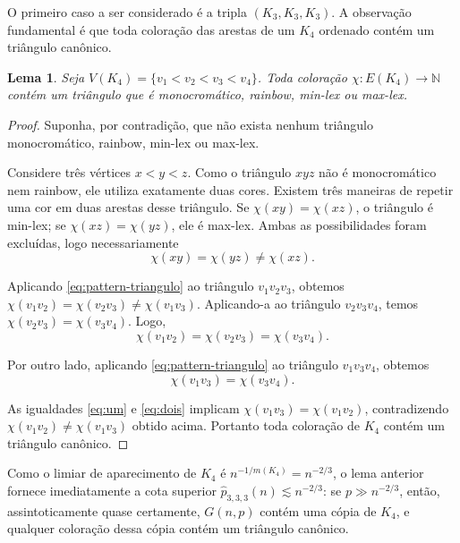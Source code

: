 \documentclass[reqno, 12pt]{amsart}
\numberwithin{equation}{section}
\theoremstyle{plain}
\newtheorem{lemma}[theorem]{Lema}
\theoremstyle{definition}
\begin{document}
O primeiro caso a ser considerado é a tripla $(K_3,K_3,K_3)$. A
observação fundamental é que toda coloração das arestas de um $K_4$
ordenado contém um triângulo canônico.

\begin{lemma}
  \label{lem:K4-canonical-triangle}
  Seja $V(K_4)=\{v_1<v_2<v_3<v_4\}$. Toda coloração
  $\chi:E(K_4)\to\mathbb{N}$ contém um triângulo que é
  monocromático, rainbow, min-lex ou max-lex.
\end{lemma}

\begin{proof}
  Suponha, por contradição, que não exista nenhum triângulo
  monocromático, rainbow, min-lex ou max-lex.

  Considere três vértices $x<y<z$. Como o triângulo $xyz$ não é
  monocromático nem rainbow, ele utiliza exatamente duas cores.
  Existem três maneiras de repetir uma cor em duas arestas desse
  triângulo. Se $\chi(xy)=\chi(xz)$, o triângulo é min-lex; se
  $\chi(xz)=\chi(yz)$, ele é max-lex. Ambas as possibilidades foram
  excluídas, logo necessariamente
  \begin{equation}
    \label{eq:pattern-triangulo}
    \chi(xy)=\chi(yz)\neq\chi(xz).
  \end{equation}

  Aplicando \eqref{eq:pattern-triangulo} ao triângulo $v_1v_2v_3$,
  obtemos $\chi(v_1v_2)=\chi(v_2v_3)\neq\chi(v_1v_3)$. Aplicando-a
  ao triângulo $v_2v_3v_4$, temos $\chi(v_2v_3)=\chi(v_3v_4)$. Logo,
  \begin{equation}
    \label{eq:um}
    \chi(v_1v_2)=\chi(v_2v_3)=\chi(v_3v_4).
  \end{equation}

  Por outro lado, aplicando \eqref{eq:pattern-triangulo} ao
  triângulo $v_1v_3v_4$, obtemos
  \begin{equation}
    \label{eq:dois}
    \chi(v_1v_3)=\chi(v_3v_4).
  \end{equation}

  As igualdades \eqref{eq:um} e \eqref{eq:dois} implicam
  $\chi(v_1v_3)=\chi(v_1v_2)$, contradizendo
  $\chi(v_1v_2)\neq\chi(v_1v_3)$ obtido acima. Portanto toda
  coloração de $K_4$ contém um triângulo canônico.
\end{proof}

Como o limiar de aparecimento de $K_4$ é
$n^{-1/m(K_4)}=n^{-2/3}$, o lema anterior fornece imediatamente a
cota superior $\widehat p_{3,3,3}(n)\lesssim n^{-2/3}$: se
$p\gg n^{-2/3}$, então, assintoticamente quase certamente,
$G(n,p)$ contém uma cópia de $K_4$, e qualquer coloração dessa
cópia contém um triângulo canônico.
\end{document}
